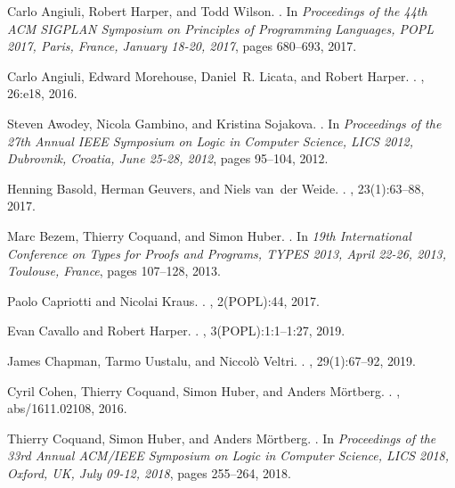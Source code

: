 \documentclass[9pt]{entcs}
\newcommand{\0}{\textbf{0}} %
\begin{document}
\begin{thebibliography}{10}
	Carlo Angiuli, Robert Harper, and Todd Wilson.
	.
	\newblock In {\em Proceedings of the 44th {ACM} {SIGPLAN} Symposium on
		Principles of Programming Languages, {POPL} 2017, Paris, France, January
		18-20, 2017}, pages 680--693, 2017.
	
	Carlo Angiuli, Edward Morehouse, Daniel~R. Licata, and Robert Harper.
	.
	, 26:e18, 2016.
	
	Steven Awodey, Nicola Gambino, and Kristina Sojakova.
	.
	\newblock In {\em Proceedings of the 27th Annual {IEEE} Symposium on Logic in
		Computer Science, {LICS} 2012, Dubrovnik, Croatia, June 25-28, 2012}, pages
	95--104, 2012.
	
	Henning Basold, Herman Geuvers, and Niels van~der Weide.
	.
	, 23(1):63--88, 2017.
	
	Marc Bezem, Thierry Coquand, and Simon Huber.
	.
	\newblock In {\em 19th International Conference on Types for Proofs and
		Programs, {TYPES} 2013, April 22-26, 2013, Toulouse, France}, pages 107--128,
	2013.
	
	Paolo Capriotti and Nicolai Kraus.
	.
	, 2(POPL):44,
	2017.
	
	Evan Cavallo and Robert Harper.
	.
	, 3({POPL}):1:1--1:27, 2019.
	
	James Chapman, Tarmo Uustalu, and Niccol{\`{o}} Veltri.
	.
	, 29(1):67--92,
	2019.
	
	Cyril Cohen, Thierry Coquand, Simon Huber, and Anders M{\"{o}}rtberg.
	.
	, abs/1611.02108, 2016.
	
	Thierry Coquand, Simon Huber, and Anders M{\"{o}}rtberg.
	.
	\newblock In {\em Proceedings of the 33rd Annual {ACM/IEEE} Symposium on Logic
		in Computer Science, {LICS} 2018, Oxford, UK, July 09-12, 2018}, pages
	255--264, 2018.
	

\end{thebibliography}
\end{document}
